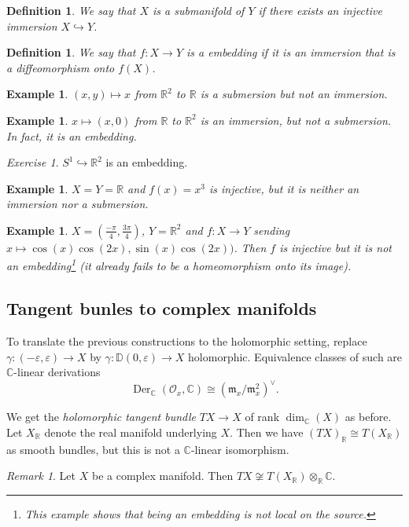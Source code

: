\documentclass[12pt]{article}
\theoremstyle{darkgreentheorem}
\theoremstyle{darkbluedefinition}
\newtheorem{defn}[thm]{Definition}
\theoremstyle{darkredexample}
\newtheorem{exa}[thm]{Example}
\theoremstyle{remark}
\newtheorem{rem}[thm]{Remark}
\newtheorem{exe}[thm]{Exercise}
\newcommand{\R}{\mathbb{R}}
\newcommand{\1}{\mathbbm{1}}
\newcommand{\C}{\mathbb{C}}
\newcommand{\bbD}{\mathbb{D}}
\renewcommand{\O}{\mathcal{O}}
\newcommand{\m}{\mathfrak{m}}
\DeclareMathOperator{\Der}{Der}
\newcommand{\ot}{\otimes}
\newcommand{\dual}{^{\vee}}
\newcommand{\mono}{\hookrightarrow}
\begin{document}
\begin{defn}
    We say that $X$ is a \textit{submanifold} of $Y$ if there exists an injective immersion $X\mono Y$.
\end{defn}

\begin{defn}
    We say that $f\colon X\to Y$ is a \textit{embedding} if it is an immersion that is a diffeomorphism onto $f(X)$.
\end{defn}

\begin{exa}
    $(x,y)\mapsto x$ from $\R^{2}$ to $\R$ is a submersion but not an immersion.
\end{exa}

\begin{exa}
    $x\mapsto (x,0)$ from $\R$ to $\R^{2}$ is an immersion, but not a submersion.
    In fact, it is an embedding.
\end{exa}

\begin{exe}
    $S^{1}\mono \R^{2}$ is an embedding.
\end{exe}

\begin{exa}
    $X=Y=\R$ and $f(x)=x^{3}$ is injective, but it is neither an immersion nor a submersion.
\end{exa}

\begin{exa}
    $X=(\frac{-\pi}{4},\frac{3\pi}{4})$, $Y=\R^{2}$ and $f\colon X\to Y$ sending $x\mapsto \cos(x)\cos(2x),\sin(x)\cos(2x))$.
    Then $f$ is injective but it is not an embedding\footnote{This example shows that being an embedding is not local on the source.} (it already fails to be a homeomorphism onto its image).
\end{exa}

\subsection{Tangent bunles to complex manifolds}

To translate the previous constructions to the holomorphic setting, replace $\gamma\colon (-\varepsilon,\varepsilon)\to X$ by $\gamma\colon \bbD(0,\varepsilon)\to X$ holomorphic.
Equivalence classes of such are $\C$-linear derivations
\[ \Der_{\C}(\O_{x},\C)\cong (\m_{x}/\m_{x}^{2})\dual. \]

We get the \textit{holomorphic tangent bundle} $TX\to X$ of rank $\dim_{\C}(X)$ as before.
Let $X_{\R}$ denote the real manifold underlying $X$.
Then we have $(TX)_{\R}\cong T(X_{\R})$ as smooth bundles, but this is not a $\C$-linear isomorphism.

\begin{rem}
    Let $X$ be a complex manifold.
    Then $TX\not\cong T(X_{\R})\ot_{\R}\C$.
\end{rem}



\end{document}

